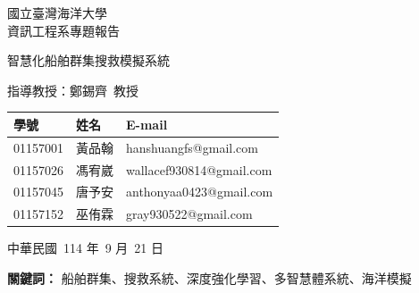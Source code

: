 \documentclass[12pt,a4paper]{article}
\begin{document}
\begin{titlepage}

	\centering
	\vspace*{2cm}
	
	{\Large 國立臺灣海洋大學\\[0.5cm]資訊工程系專題報告 \par}
	
	\vspace*{1cm}
	{\Huge 智慧化船舶群集搜救模擬系統 \par}
	
	\vfill
	
	{\Large 指導教授：鄭錫齊\ 教授 \par}
	\vspace*{1cm}
	\begin{tabular}{lll}
	學號 & 姓名 & E-mail \\
	\hline
	01157001 & 黃品翰 & hanshuangfs@gmail.com \\
	01157026 & 馮宥崴 & wallacef930814@gmail.com \\
	01157045 & 唐予安 & anthonyaa0423@gmail.com \\
	01157152 & 巫侑霖 & gray930522@gmail.com
	\end{tabular}

	\vspace*{1cm}
	{\Large 中華民國\ 114 年\ 9 月\ 21 日 \par}

\end{titlepage}

\vspace*{0.3\textheight}
\begin{abstract}
海上搜救任務面臨著範圍廣闊、海象險惡、時間緊迫等嚴峻挑戰。為應對此一難題，本專案建構了一套「智慧化船舶群集搜救模擬系統」。系統核心旨在模擬並最佳化真實的搜救作業流程：首先，依據目標可能區域進行高效的網格化分割；接著，指揮調度多艘船隻構成的搜救群集，對各區塊展開平行搜索，以最大化覆蓋率並縮短搜尋時間。我們在 Unity 與 Crest 物理引擎打造的擬真海洋環境中，採用 SAC 深度強化學習演算法，賦予每艘搜救船隻在複雜風浪中自主執行精密搜索路徑、並規避動態障礙物的能力。本專案旨在評估此 AI 驅動的搜救群集，在不同搜救情境下，對於提升目標發現成功率、縮短搜救時間的實際成效，為未來智慧化海上應急響應系統提供關鍵的模擬驗證。
\end{abstract}

\centerline{\textbf{關鍵詞：} 船舶群集、搜救系統、深度強化學習、多智慧體系統、海洋模擬}

\newpage

\tableofcontents
\newpage
\end{document}
